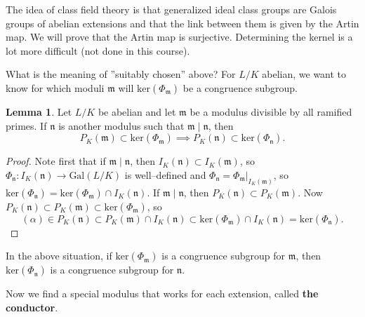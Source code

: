 \documentclass{article}
\theoremstyle{definition}
\newtheorem{lemma}[theorem]{Lemma}
\begin{document}
The idea of class field theory is that generalized ideal class groups are Galois groups of abelian extensions and that the link between them is given by the Artin map. We will prove that the Artin map is surjective. Determining the kernel is a lot more difficult (not done in this course).
\vspace{1mm}
 
What is the meaning of ''suitably chosen'' above? For $L/K$ abelian, we want to know for which moduli $\mathfrak{m}$ will $\text{ker}(\Phi_\mathfrak{m})$ be a congruence subgroup.
\begin{lemma}\label{lemma1.7}
    Let $L/K$ be abelian and let $\mathfrak{m}$ be a modulus divisible by all ramified primes. If $\mathfrak{n}$ is another modulus such that $\mathfrak{m} \mid \mathfrak{n}$, then \[
    P_K(\mathfrak{m}) \subset \text{ker}(\Phi_{\mathfrak{m}}) \implies P_K(\mathfrak{n}) \subset  \text{ker}(\Phi_{\mathfrak{n}}).
    \]
\end{lemma}
\begin{proof}
    Note first that if $\mathfrak{m} \mid \mathfrak{n}$, then $I_K(\mathfrak{n}) \subset I_K(\mathfrak{m})$, so $\Phi_\mathfrak{n} : I_K(\mathfrak{n}) \to \text{Gal}(L/K)$ is well--defined and $\Phi_{\mathfrak{n}} = \Phi_{\mathfrak{m}}|_{I_K(\mathfrak{m})}$, so $\text{ker}(\Phi_{\mathfrak{n}}) = \text{ker}(\Phi_{\mathfrak{m}}) \cap I_K(\mathfrak{n})$. If $\mathfrak{m} \mid \mathfrak{n}$, then $P_K(\mathfrak{n}) \subset P_K(\mathfrak{m})$. Now $P_K(\mathfrak{n}) \subset P_K(\mathfrak{m}) \subset \text{ker}(\Phi_{\mathfrak{m}})$, so \[
        (\alpha) \in P_K(\mathfrak{n}) \subset P_K(\mathfrak{m}) \cap I_K(\mathfrak{n}) \subset \text{ker}(\Phi_{\mathfrak{m}}) \cap I_K(\mathfrak{n}) = \text{ker}(\Phi_{\mathfrak{n}}).
    \]
\end{proof}
In the above situation, if $\text{ker}(\Phi_{\mathfrak{m}})$ is a congruence subgroup for $\mathfrak{m}$, then $\text{ker}(\Phi_{\mathfrak{n}})$ is a congruence subgroup for $\mathfrak{n}$.
\vspace{1mm}
 
Now we find a special modulus that works for each extension, called \textbf{the conductor}. 

\end{document}
